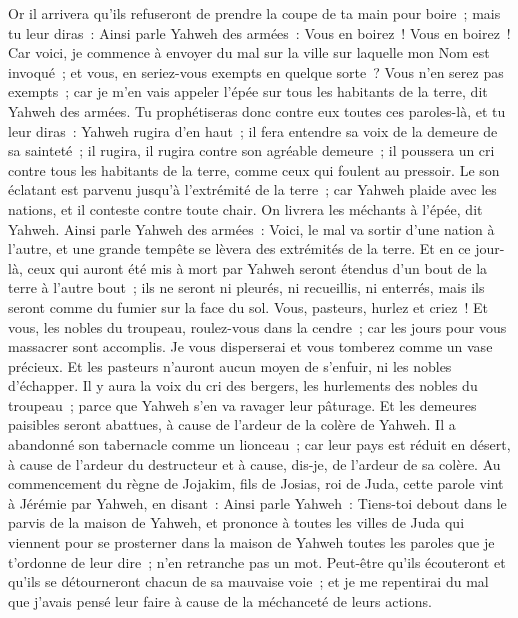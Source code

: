 \begin{multicols}{2}
Or il arrivera qu'ils refuseront de prendre la coupe de ta main pour boire~; mais tu leur diras~: Ainsi parle Yahweh des armées~: Vous en boirez~! Vous en boirez~!
Car voici, je commence à envoyer du mal sur la ville sur laquelle mon Nom est invoqué~; et vous, en seriez-vous exempts en quelque sorte~? Vous n'en serez pas exempts~; car je m'en vais appeler l'épée sur tous les habitants de la terre, dit Yahweh des armées.
Tu prophétiseras donc contre eux toutes ces paroles-là, et tu leur diras~: Yahweh rugira d'en haut~; il fera entendre sa voix de la demeure de sa sainteté~; il rugira, il rugira contre son agréable demeure~; il poussera un cri contre tous les habitants de la terre, comme ceux qui foulent au pressoir.
Le son éclatant est parvenu jusqu'à l'extrémité de la terre~; car Yahweh plaide avec les nations, et il conteste contre toute chair. On livrera les méchants à l'épée, dit Yahweh.
Ainsi parle Yahweh des armées~: Voici, le mal va sortir d'une nation à l'autre, et une grande tempête se lèvera des extrémités de la terre.
Et en ce jour-là, ceux qui auront été mis à mort par Yahweh seront étendus d'un bout de la terre à l'autre bout~; ils ne seront ni pleurés, ni recueillis, ni enterrés, mais ils seront comme du fumier sur la face du sol.
Vous, pasteurs, hurlez et criez~! Et vous, les nobles du troupeau, roulez-vous dans la cendre~; car les jours pour vous massacrer sont accomplis. Je vous disperserai et vous tomberez comme un vase précieux.
Et les pasteurs n'auront aucun moyen de s'enfuir, ni les nobles d'échapper.
Il y aura la voix du cri des bergers, les hurlements des nobles du troupeau~; parce que Yahweh s'en va ravager leur pâturage.
Et les demeures paisibles seront abattues, à cause de l'ardeur de la colère de Yahweh.
Il a abandonné son tabernacle comme un lionceau~; car leur pays est réduit en désert, à cause de l'ardeur du destructeur et à cause, dis-je, de l'ardeur de sa colère.
\VerseOne{}Au commencement du règne de Jojakim, fils de Josias, roi de Juda, cette parole vint à Jérémie par Yahweh, en disant~:
Ainsi parle Yahweh~: Tiens-toi debout dans le parvis de la maison de Yahweh, et prononce à toutes les villes de Juda qui viennent pour se prosterner dans la maison de Yahweh toutes les paroles que je t'ordonne de leur dire~; n'en retranche pas un mot.
Peut-être qu'ils écouteront et qu'ils se détourneront chacun de sa mauvaise voie~; et je me repentirai du mal que j'avais pensé leur faire à cause de la méchanceté de leurs actions.

\end{multicols}
